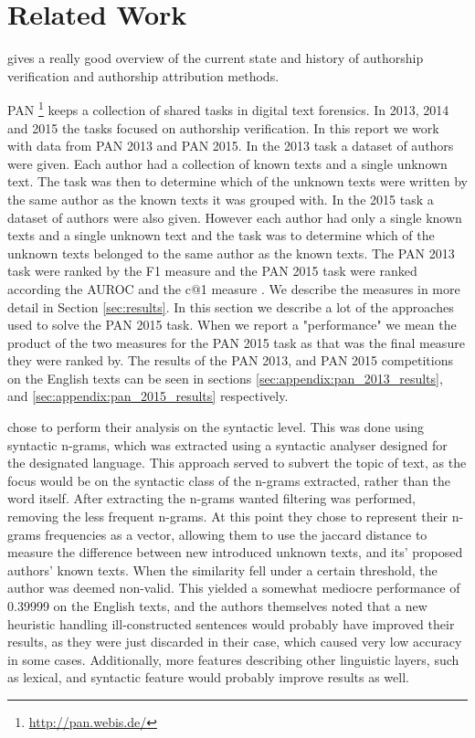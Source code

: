 \section{Related Work} \label{sec:related_work}
\cite{stamatos2009} gives a really good overview of the current state and
history of authorship verification and authorship attribution methods.

PAN \footnote{\url{http://pan.webis.de/}} keeps a collection of shared tasks in
digital text forensics. In 2013, 2014 and 2015 the tasks focused on authorship
verification. In this report we work with data from PAN 2013 and PAN 2015. In
the 2013 task a dataset of authors were given. Each author had a collection
of known texts and a single unknown text. The task was then to determine
which of the unknown texts were written by the same author as the known texts
it was grouped with. In the 2015 task a dataset of authors were also given.
However each author had only a single known texts and a single unknown text
and the task was to determine which of the unknown texts belonged to the same
author as the known texts. The PAN 2013 task were ranked by the F1 measure
and the PAN 2015 task were ranked according the \gls{AUROC} and the c@1
measure \cite{penas2011}. We describe the measures in more detail in Section
\ref{sec:results}. In this section we describe a lot of the approaches used to
solve the PAN 2015 task. When we report a "performance" we mean the product
of the two measures for the PAN 2015 task as that was the final measure they
were ranked by. The results of the PAN 2013, and PAN 2015 competitions on the
English texts can be seen in sections \ref{sec:appendix:pan_2013_results}, and
\ref{sec:appendix:pan_2015_results} respectively.

\cite{juanpablo2015} chose to perform their analysis on the syntactic level.
This was done using syntactic n-grams, which was extracted using a syntactic
analyser designed for the designated language. This approach served to subvert
the topic of text, as the focus would be on the syntactic class of the n-grams
extracted, rather than the word itself. After extracting the n-grams wanted
filtering was performed, removing the less frequent n-grams. At this point they
chose to represent their n-grams frequencies as a vector, allowing them to use
the jaccard distance to measure the difference between new introduced unknown
texts, and its' proposed authors' known texts. When the similarity fell under
a certain threshold, the author was deemed non-valid. This yielded a somewhat
mediocre performance of 0.39999 on the English texts, and the authors themselves
noted that a new heuristic handling ill-constructed sentences would probably
have improved their results, as they were just discarded in their case, which
caused very low accuracy in some cases. Additionally, more features describing
other linguistic layers, such as lexical, and syntactic feature would probably
improve results as well.

